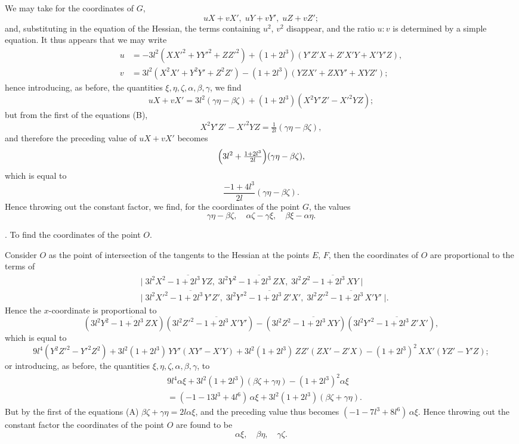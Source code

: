 \documentclass[11pt]{article}
\begin{document}
We may take for the coordinates of $G$,
\[
u X + v X',\; u Y + v Y',\; u Z + v Z';
\]
and, substituting in the equation of the Hessian, the terms containing $u^2$, $v^2$ disappear, and the ratio $u : v$ is determined by a simple equation. It thus appears that we may write
\begin{align*}
u &= -3 l^2 (X X'^2 + Y Y'^2 + Z Z'^2) + (1 + 2 l^3)(Y' Z' X + Z' X' Y + X' Y' Z), \\
v &= 3 l^2 (X^2 X' + Y^2 Y' + Z^2 Z') - (1 + 2 l^3)(Y Z X' + Z X Y' + X Y Z');
\end{align*}
hence introducing, as before, the quantities $\xi, \eta, \zeta, \alpha, \beta, \gamma$, we find
\[
u X + v X' = 3 l^2 (\gamma\eta - \beta\zeta) + (1 + 2 l^3)(X^2 Y' Z' - X'^2 Y Z);
\]
but from the first of the equations (B),
\[
X^2 Y' Z' - X'^2 Y Z = \tfrac{1}{2 l}(\gamma\eta - \beta\zeta),
\]
and therefore the preceding value of $u X + v X'$ becomes
\[
\Bigl(3 l^2 + \tfrac{1 + 2 l^3}{2 l}\Bigr)(\gamma\eta - \beta\zeta),
\]
which is equal to
\[
\frac{-1 + 4 l^3}{2 l}(\gamma\eta - \beta\zeta).
\]
Hence throwing out the constant factor, we find, for the coordinates of the point $G$, the values
\[
\gamma\eta - \beta\zeta,\quad \alpha\zeta - \gamma\xi,\quad \beta\xi - \alpha\eta.
\]

\medskip

. To find the coordinates of the point $O$.

Consider $O$ as the point of intersection of the tangents to the Hessian at the points $E$, $F$, then the coordinates of $O$ are proportional to the terms of
\begin{align*}
&\bigl|\; 3 l^2 X^2 - \overline{1 + 2 l^3}\, Y Z,\; 3 l^2 Y^2 - \overline{1 + 2 l^3}\, Z X,\; 3 l^2 Z^2 - \overline{1 + 2 l^3}\, X Y\;\bigr| \\
&\bigl|\; 3 l^2 X'^2 - \overline{1 + 2 l^3}\, Y' Z',\; 3 l^2 Y'^2 - \overline{1 + 2 l^3}\, Z' X',\; 3 l^2 Z'^2 - \overline{1 + 2 l^3}\, X' Y' \;\bigr|.
\end{align*}
Hence the $x$-coordinate is proportional to
\[
(3 l^2 Y^2 - \overline{1 + 2 l^3}\, Z X)(3 l^2 Z'^2 - \overline{1 + 2 l^3}\, X' Y') - (3 l^2 Z^2 - \overline{1 + 2 l^3}\, X Y)(3 l^2 Y'^2 - \overline{1 + 2 l^3}\, Z' X'),
\]
which is equal to
\[
9 l^4 (Y^2 Z'^2 - Y'^2 Z^2) + 3 l^2 (1 + 2 l^3)\, Y Y' (X Y' - X' Y) + 3 l^2 (1 + 2 l^3)\, Z Z' (Z X' - Z' X) - (1 + 2 l^3)^2\, X X' (Y Z' - Y' Z);
\]
or introducing, as before, the quantities $\xi, \eta, \zeta, \alpha, \beta, \gamma$, to
\begin{align*}
&9 l^4 \alpha\xi + 3 l^2 (1 + 2 l^3)(\beta\zeta + \gamma\eta) - (1 + 2 l^3)^2 \alpha\xi \\
&= (-1 - 13 l^3 + 4 l^6)\,\alpha\xi + 3 l^2 (1 + 2 l^3)(\beta\zeta + \gamma\eta).
\end{align*}
But by the first of the equations (A) $\beta\zeta + \gamma\eta = 2 l \alpha\xi$, and the preceding value thus becomes $(-1 - 7 l^3 + 8 l^6)\,\alpha\xi$. Hence throwing out the constant factor the coordinates of the point $O$ are found to be
\[
\alpha\xi,\quad \beta\eta,\quad \gamma\zeta.
\]
\end{document}
